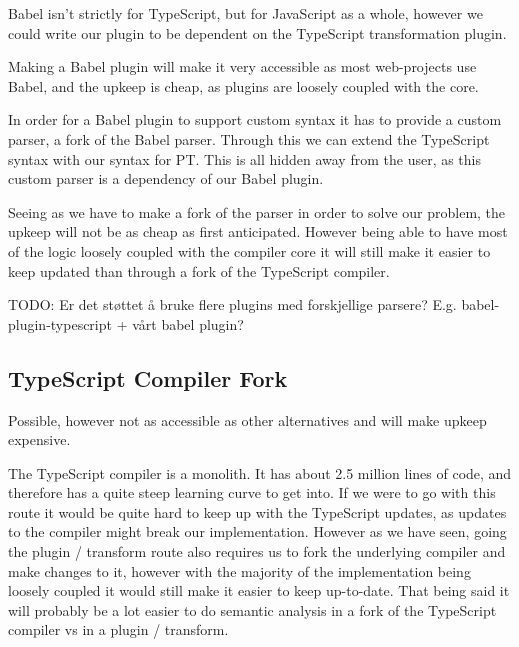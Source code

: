 Babel isn't strictly for TypeScript, but for JavaScript as a whole, however we could write our plugin to be dependent on the TypeScript transformation plugin.

Making a Babel plugin will make it very accessible as most web-projects use Babel, and the upkeep is cheap, as plugins are loosely coupled with the core.

In order for a Babel plugin to support custom syntax it has to provide a custom parser, a fork of the Babel parser.
Through this we can extend the TypeScript syntax with our syntax for PT.
This is all hidden away from the user, as this custom parser is a dependency of our Babel plugin.

Seeing as we have to make a fork of the parser in order to solve our problem, the upkeep will not be as cheap as first anticipated.
However being able to have most of the logic loosely coupled with the compiler core it will still make it easier to keep updated than through a fork of the TypeScript compiler.

TODO: Er det støttet å bruke flere plugins med forskjellige parsere?
E.g. babel-plugin-typescript + vårt babel plugin?

\subsection{TypeScript Compiler Fork}\label{subsec:typescript-compiler-fork}

Possible, however not as accessible as other alternatives and will make upkeep expensive.

The TypeScript compiler is a monolith.
It has about 2.5 million lines of code, and therefore has a quite steep learning curve to get into.
If we were to go with this route it would be quite hard to keep up with the TypeScript updates, as updates to the compiler might break our implementation.
However as we have seen, going the plugin / transform route also requires us to fork the underlying compiler and make changes to it, however with the majority of the implementation being loosely coupled it would still make it easier to keep up-to-date.
That being said it will probably be a lot easier to do semantic analysis in a fork of the TypeScript compiler vs in a plugin / transform.
